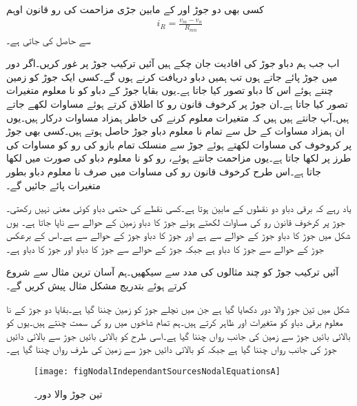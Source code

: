 کسی بھی دو جوڑ  اور  کے مابین جڑی مزاحمت  کی رو  قانون اوہم
\begin{align}\label{مساوات-جوڑ_قانون_اوہم}
i_R=\frac{v_m-v_n}{R_{mn}}
\end{align}
سے حاصل کی جاتی ہے۔

اب جب ہم دباو جوڑ کی افادیت جان چکے ہیں آئیں ترکیب جوڑ پر غور کریں۔اگر دور میں  جوڑ پائے جاتے ہوں تب ہمیں  دباو دریافت کرنے ہوں گے۔کسی ایک جوڑ کو زمین چنتے ہوئے اس کا دباو  تصور کیا جاتا ہے۔یوں بقایا  جوڑ کے دباو کو نا معلوم متغیرات تصور کیا جاتا ہے۔ان  جوڑ پر کرخوف قانون رو کا اطلاق کرتے ہوئے  مساوات لکھے جاتے ہیں۔آپ جانتے ہیں ہیں کہ  متغیرات معلوم کرنے کی خاطر  ہمزاد مساوات درکار ہیں۔یوں ان  ہمزاد مساوات کے حل سے تمام نا معلوم دباو جوڑ حاصل ہوتے ہیں۔کسی بھی جوڑ پر کروخوف کی مساوات لکھتے ہوئے جوڑ سے منسلک تمام بازو کی رو کو مساوات  کی طرز پر لکھا جاتا ہے۔یوں مزاحمت جانتے ہوئے، رو کو نا معلوم دباو کی صورت میں لکھا جاتا ہے۔اس طرح کرخوف قانون رو کی مساوات میں صرف نا معلوم دباو بطور متغیرات پائے جائیں گے۔

 یاد رہے کہ برقی دباو دو نقطوں کے مابین ہوتا ہے۔کسی نقطے کی حتمی دباو کوئی معنی نہیں رکھتی۔جوڑ پر کرخوف قانون رو کی مساوات لکھتے ہوئے جوڑ کا دباو زمین کے حوالے سے ناپا جاتا ہے۔ یوں شکل  میں جوڑ  کا دباو جوڑ  کے حوالے سے  ہے اور جوڑ  کا دباو جوڑ  کے حوالے سے  ہے۔اس کے برعکس جوڑ  کے حوالے سے جوڑ  کا دباو  ہے جبکہ جوڑ  کے حوالے سے جوڑ  کا دباو  اور جوڑ  کا دباو  ہے۔ 


آئیں ترکیب جوڑ کو چند مثالوں کی مدد سے سیکھیں۔ہم آسان ترین مثال سے شروع کرتے ہوئے بتدریج مشکل مثال پیش کریں گے۔

شکل  میں تین جوڑ والا دور دکھایا گیا ہے جن میں نچلے جوڑ کو زمین چننا گیا ہے۔بقایا دو جوڑ کے نا معلوم برقی دباو کو متغیرات  اور  ظاہر کرتے ہیں۔ہم تمام شاخوں میں رو کی سمت چنتے ہیں۔یوں  کو بالائی بائیں جوڑ سے زمین کی جانب رواں چننا گیا ہے۔اسی طرح  کو بالائی بائیں جوڑ سے بالائی دائیں جوڑ کی جانب رواں چننا گیا ہے جبکہ  کو بالائی دائیں جوڑ سے زمین کی طرف رواں چننا گیا ہے۔
\begin{figure}
\centering
\texttt{[image: figNodalIndependantSourcesNodalEquationsA]}
\caption{تین جوڑ والا دور۔}
\label{شکل_جوڑ_تین_جوڑ}
\end{figure}%

